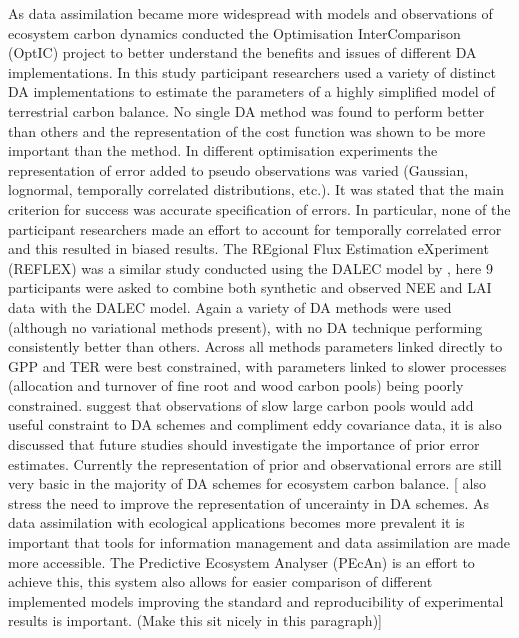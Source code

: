 \documentclass[12pt]{article}
\begin{document}
As data assimilation became more widespread with models and observations of ecosystem carbon dynamics \citet{trudinger2007optic} conducted the Optimisation InterComparison (OptIC) project to better understand the benefits and issues of different DA implementations. In this study participant researchers used a variety of distinct DA implementations to estimate the parameters of a highly simplified model of terrestrial carbon balance. No single DA method was found to perform better than others and the representation of the cost function was shown to be more important than the method. In different optimisation experiments the representation of error added to pseudo observations was varied (Gaussian, lognormal, temporally correlated distributions, etc.). It was stated that the main criterion for success was accurate specification of errors. In particular, none of the participant researchers made an effort to account for temporally correlated error and this resulted in biased results. The REgional Flux Estimation eXperiment (REFLEX) was a similar study conducted using the DALEC model by \citet{fox2009reflex}, here 9 participants were asked to combine both synthetic and observed NEE and LAI data with the DALEC model. Again a variety of DA methods were used (although no variational methods present), with no DA technique performing consistently better than others. Across all methods parameters linked directly to GPP and TER were best constrained, with parameters linked to slower processes (allocation and turnover of fine root and wood carbon pools) being poorly constrained. \citet{fox2009reflex} suggest that observations of slow large carbon pools would add useful constraint to DA schemes and compliment eddy covariance data, it is also discussed that future studies should investigate the importance of prior error estimates. Currently the representation of prior and observational errors are still very basic in the majority of DA schemes for ecosystem carbon balance. [\citep{Dietze2013} also stress the need to improve the representation of uncerainty in DA schemes. As data assimilation with ecological applications becomes more prevalent it is important that tools for information management and data assimilation are made more accessible. The Predictive Ecosystem Analyser (PEcAn) is an effort to achieve this, this system also allows for easier comparison of different implemented models \citep{Dietze2013} improving the standard and reproducibility of experimental results is important. (Make this sit nicely in this paragraph)]
\end{document}
